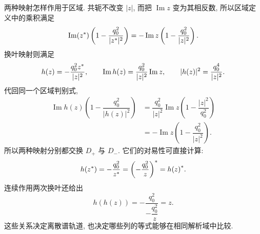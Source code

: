 \par\smallskip\noindent 两种映射怎样作用于区域.\quad
共轭不改变 $|z|$, 而把 $\operatorname{Im}z$ 变为其相反数,
所以区域定义中的乘积满足
\begin{equation*}
\operatorname{Im}({z}^{*})
\left(1-\dfrac{q_0^2}{|{z}^{*}|^2}\right)
=-\operatorname{Im}z\left(1-\dfrac{q_0^2}{|z|^2}\right).
\end{equation*}
换叶映射则满足
\begin{equation*}
h(z)=-\dfrac{q_0^2{z}^{*}}{|z|^2},
\qquad
\operatorname{Im}h(z)=\dfrac{q_0^2}{|z|^2}\operatorname{Im}z,
\qquad
|h(z)|^2=\dfrac{q_0^4}{|z|^2}.
\end{equation*}
代回同一个区域判别式,
\begin{align*}
\operatorname{Im}h(z)
\left(1-\dfrac{q_0^2}{|h(z)|^2}\right)
&=\dfrac{q_0^2}{|z|^2}\operatorname{Im}z
\left(1-\dfrac{|z|^2}{q_0^2}\right)\\
&=-\operatorname{Im}z\left(1-\dfrac{q_0^2}{|z|^2}\right).
\end{align*}
所以两种映射分别都交换 $D_+$ 与 $D_-$.
它们的对易性可直接计算:
\begin{equation*}
h({z}^{*})=-\dfrac{q_0^2}{{z}^{*}}
={\left(-\dfrac{q_0^2}{z}\right)}^{*}={h(z)}^{*}.
\end{equation*}
连续作用两次换叶还给出
\begin{equation*}
h(h(z))=-\dfrac{q_0^2}{-\dfrac{q_0^2}{z}}=z.
\end{equation*}
这些关系决定离散谱轨道, 也决定哪些列的等式能够在相同解析域中比较.



